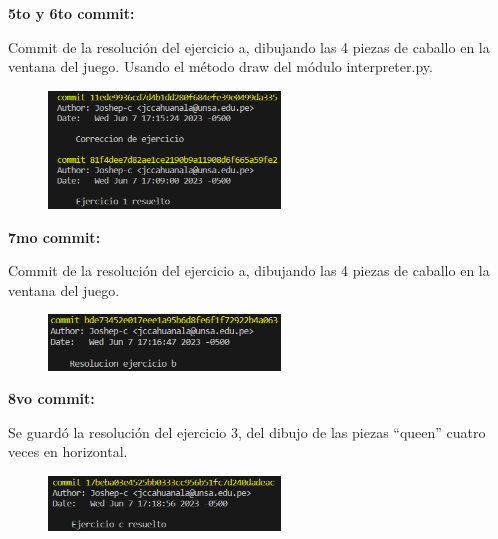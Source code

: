 \documentclass{article}
\begin{document}
	\textbf{5to y 6to commit:}
	
	\vspace{0.3cm}
	Commit de la resolución del ejercicio a, dibujando las 4 piezas de caballo en la ventana del juego. Usando el método draw del módulo interpreter.py.
	\vspace{0.3cm}
	
	\begin{figure}[H]
		\centering
		\includegraphics[width=0.55\textwidth,keepaspectratio]{img/commit5-6.png}
	\end{figure}
	
	\textbf{7mo commit:}
	
	\vspace{0.3cm}
	Commit de la resolución del ejercicio a, dibujando las 4 piezas de caballo en la ventana del juego.
	\vspace{0.3cm}
	
	\begin{figure}[H]
		\centering
		\includegraphics[width=0.55\textwidth,keepaspectratio]{img/commit7.png}
	\end{figure}
	
	\textbf{8vo commit:}
	
	\vspace{0.3cm}
	Se guardó la resolución del ejercicio 3, del dibujo de las piezas “queen” cuatro veces en horizontal.
	\vspace{0.3cm}
	
	\begin{figure}[H]
		\centering
		\includegraphics[width=0.55\textwidth,keepaspectratio]{img/commit8.png}
	\end{figure}
	
\end{document}
